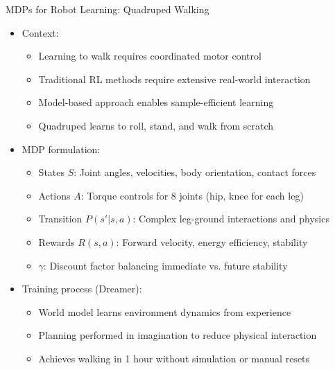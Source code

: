 \documentclass[10pt]{beamer}
\begin{document}
\begin{frame}{MDPs for Robot Learning: Quadruped Walking}
    \begin{itemize}
        \item Context:
        \begin{itemize}
            \item Learning to walk requires coordinated motor control
            \item Traditional RL methods require extensive real-world interaction
            \item Model-based approach enables sample-efficient learning
            \item Quadruped learns to roll, stand, and walk from scratch
        \end{itemize}
        \vspace{0.2cm}
        \item MDP formulation:
        \begin{itemize}
            \item States $S$: Joint angles, velocities, body orientation, contact forces
            \item Actions $A$: Torque controls for 8 joints (hip, knee for each leg)
            \item Transition $P(s'|s,a)$: Complex leg-ground interactions and physics
            \item Rewards $R(s,a)$: Forward velocity, energy efficiency, stability
            \item $\gamma$: Discount factor balancing immediate vs. future stability
        \end{itemize}
        \vspace{0.2cm}
        \item Training process (Dreamer):
        \begin{itemize}
            \item World model learns environment dynamics from experience
            \item Planning performed in imagination to reduce physical interaction
            \item Achieves walking in 1 hour without simulation or manual resets
        \end{itemize}
    \end{itemize}
\end{frame}

\end{document}
